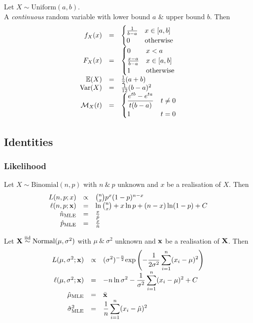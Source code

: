 \documentclass[11pt,a4paper]{article}
\begin{document}
Let $X\sim\text{Uniform}(a,b)$.\\
A \textit{continuous} random variable with lower bound $a$ \& upper bound $b$. Then
\[\begin{array}{rcll}
f_X(x)&=&\begin{cases}\frac{1}{b-a}&x\in[a,b]\\0&\text{otherwise}\end{cases}\\
F_X(x)&=&\begin{cases}0&x<a\\\frac{x-a}{b-a}&x\in[a,b]\\1&\text{otherwise}\end{cases}\\
\mathbb{E}(X)&=&\frac{1}{2}(a+b)\\
\mathrm{Var}(X)&=&\frac{1}{12}(b-a)^2\\
\mathcal{M}_X(t)&=&\begin{cases}\dfrac{e^{tb}-e^{ta}}{t(b-a)}&t\neq0\\1&t=0\end{cases}
\end{array}\]

\subsection{Identities}

\subsubsection{Likelihood}

Let $X\sim\text{Binomial}(n,p)$ with $n\ \&\ p$ unknown and $x$ be a realisation of $X$. Then
\[\begin{array}{rcl}
L(n,p;x)&\propto&{n\choose x}p^x(1-p)^{n-x}\\
\ell(n,p;\textbf{x})&=&\ln{n\choose x}+x\ln p+(n-x)\ln(1-p)+C\\
\hat{n}_\text{MLE}&=&\frac{x}{\hat{p}}\\
\hat{p}_\text{MLE}&=&\frac{x}{\hat{n}}\\
\end{array}\]

Let $\textbf{X}\overset{\text{iid}}{\sim}\text{Normal}(\mu,\sigma^2)$ with $\mu\ \&\ \sigma^2$ unknown and $\textbf{x}$ be a realisation of $\textbf{X}$. Then
\[\begin{array}{rcl}
L(\mu,\sigma^2;\textbf{x})&\propto&{\displaystyle(\sigma^2)^{-\frac{n}{2}}\text{exp}\left(-\frac{1}{2\sigma^2}\sum_{i=1}^n(x_i-\mu)^2\right)}\\
\ell(\mu,\sigma^2;\textbf{x})&=&{\displaystyle-n\ln\sigma^2-\frac{1}{\sigma^2}\sum_{i=1}^n(x_i-\mu)^2}+C\\
\hat{\mu}_\text{MLE}&=&\bar{\textbf{x}}\\
\hat{\sigma}^2_\text{MLE}&=&{\displaystyle\frac{1}{n}\sum_{i=1}^n(x_i-\hat\mu)^2}\\
\end{array}\]
\end{document}
